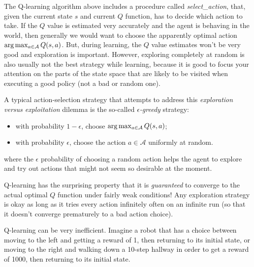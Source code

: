 The Q-learning algorithm above includes a procedure called {\it select\_action},
that, given the current state $s$ and current $Q$ function, has to decide
which action to take.  If the $Q$ value is estimated very accurately
and the agent is behaving in the world, then generally we would want
to choose the apparently optimal action ${\rm arg}\max_{a \in \mathcal{A}}
  Q(s,a)$.  But, during learning, the $Q$ value estimates won't be very
good and exploration is important.  However, exploring completely at
random is also usually not the best strategy while learning, because
it is good to focus your attention on the parts of the state space
that are likely to be visited when executing a good policy (not a bad
or random one).

A typical action-selection strategy that attempts to address this
  {\em exploration versus exploitation} dilemma is the so-called {\em
$\epsilon$-greedy} strategy:
\begin{itemize}
  \item with probability $1-\epsilon$, choose
        ${\rm arg}\max_{a \in \mathcal{A}} Q(s,a)$;
  \item with probability $\epsilon$, choose the action $a \in \mathcal{A}$
        uniformly at random.
\end{itemize}
where the $\epsilon$ probability of choosing a random action helps the
agent to explore and try out actions that might not seem so desirable
at the moment.


Q-learning has the surprising property that it is {\em guaranteed} to
converge to the actual optimal $Q$ function under fairly weak
conditions!  Any exploration strategy is okay as long as it tries
every action infinitely often on an infinite run (so that it doesn't
converge prematurely to a bad action choice).

Q-learning can be very inefficient. Imagine a robot that has a
choice between moving to the left and getting a reward of 1, then
returning to its initial state, or moving to the right and walking
down a 10-step hallway in order to get a reward of 1000, then
returning to its initial state.

\begin{center}
\end{center}

